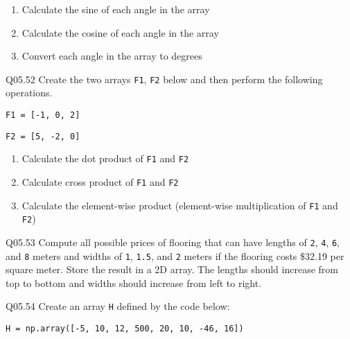 \documentclass{book}
\newcommand{\passthrough}[1]{#1}
\begin{document}
\begin{enumerate}
\def\labelenumi{(\alph{enumi})}
\item
  Calculate the sine of each angle in the array
\item
  Calculate the cosine of each angle in the array
\item
  Convert each angle in the array to degrees
\end{enumerate}

Q05.52 Create the two arrays \passthrough{\lstinline!F1!},
\passthrough{\lstinline!F2!} below and then perform the following
operations.

\passthrough{\lstinline!F1 = [-1, 0, 2]!}

\passthrough{\lstinline!F2 = [5, -2, 0]!}

\begin{enumerate}
\def\labelenumi{(\alph{enumi})}
\item
  Calculate the dot product of \passthrough{\lstinline!F1!} and
  \passthrough{\lstinline!F2!}
\item
  Calculate cross product of \passthrough{\lstinline!F1!} and
  \passthrough{\lstinline!F2!}
\item
  Calculate the element-wise product (element-wise multiplication of
  \passthrough{\lstinline!F1!} and \passthrough{\lstinline!F2!})
\end{enumerate}

Q05.53 Compute all possible prices of flooring that can have lengths of
\passthrough{\lstinline!2!}, \passthrough{\lstinline!4!},
\passthrough{\lstinline!6!}, and \passthrough{\lstinline!8!} meters and
widths of \passthrough{\lstinline!1!}, \passthrough{\lstinline!1.5!},
and \passthrough{\lstinline!2!} meters if the flooring costs \$32.19 per
square meter. Store the result in a 2D array. The lengths should
increase from top to bottom and widths should increase from left to
right.

Q05.54 Create an array \passthrough{\lstinline!H!} defined by the code
below:

\passthrough{\lstinline!H = np.array([-5, 10, 12, 500, 20, 10, -46, 16])!}
\end{document}
